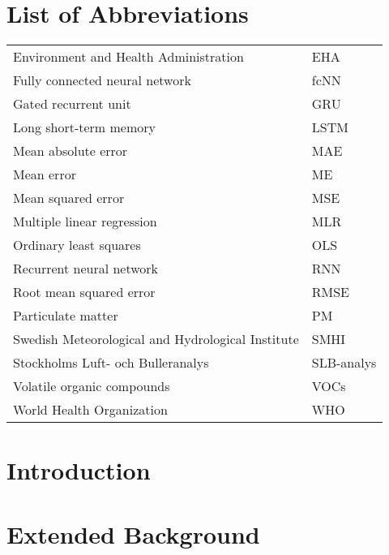 \documentclass[12pt]{report}
\numberwithin{equation}{section}
\begin{document}
\listoftables
\thispagestyle{plain}

\chapter*{List of Abbreviations}
\begin{tabular}{l@{$\dots\dots$}p{12cm}}
Environment and Health Administration \dotfill & EHA \\
Fully connected neural network\dotfill  & fcNN \\
Gated recurrent unit \dotfill & GRU \\
Long short-term memory \dotfill & LSTM \\
Mean absolute error\dotfill & MAE \\
Mean error \dotfill & ME \\
Mean squared error\dotfill & MSE \\
Multiple linear regression\dotfill & MLR \\
Ordinary least squares \dotfill & OLS \\
Recurrent neural network\dotfill & RNN \\
Root mean squared error\dotfill & RMSE\\
Particulate matter \dotfill & PM \\
Swedish Meteorological and Hydrological Institute\dotfill & SMHI \\
Stockholms Luft- och Bulleranalys \dotfill & SLB-analys \\
Volatile organic compounds \dotfill & VOCs \\
World Health Organization \dotfill & WHO \\
\end{tabular}




\chapter{Introduction}
\setcounter{page}{1}


\chapter{Extended Background}

\end{document}
